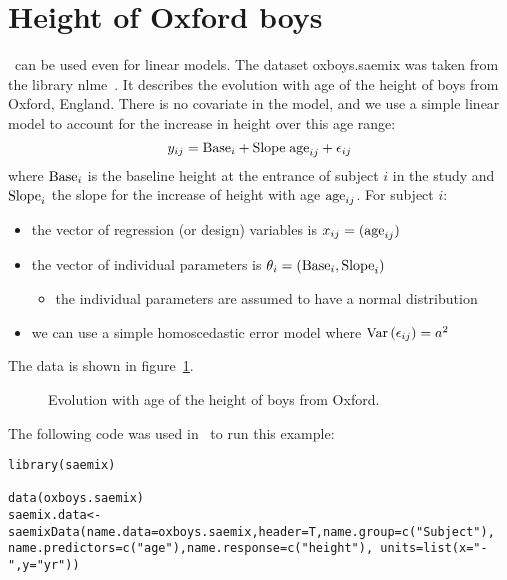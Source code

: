 {\section{Height of Oxford boys} \label{sec:exampleoxboys}

\saemix~can be used even for linear models. The dataset {\sf oxboys.saemix} was taken from the library {\sf nlme}~\cite{nlme}. It describes the evolution with age of the height of boys from Oxford, England. There is no covariate in the model, and we use a simple linear model to account for the increase in height over this age range:
\begin{equation}
y_{ij} = {\rm Base}_i + {\rm Slope} \; {\rm age}_{ij} + \epsilon_{ij}
\end{equation}
where ${\rm Base}_i$ is the baseline height at the entrance of subject $i$ in the study and ${\rm Slope}_i$ the slope for the increase of height with age ${\rm age}_{ij}$. For subject $i$:
\begin{itemize}
\item the vector of regression (or design) variables is $x_{ij} = ({\rm age}_{ij} )$
\item the vector of individual parameters is $\theta_i = \left( {\rm Base}_i, {\rm Slope}_i \right)$
   \begin{itemize}
   \item the individual parameters are assumed to have a normal distribution
   \end{itemize}
\item we can use a simple homoscedastic error model where $\mbox{Var}\left(\epsilon_{ij}\right)=a^2$
\end{itemize}

The data is shown in figure~\ref{fig:oxboysdata}.

\begin{figure}[!h]
\begin{center}
\par \kern -1cm
\end{center}
\par \kern -0.5cm
\caption{Evolution with age of the height of boys from Oxford.} \label{fig:oxboysdata}
\end{figure}

The following code was used in \R~to run this example:
\begin{verbatim}
library(saemix)

data(oxboys.saemix)
saemix.data<-saemixData(name.data=oxboys.saemix,header=T,name.group=c("Subject"), 
name.predictors=c("age"),name.response=c("height"), units=list(x="-",y="yr"))


\end{verbatim}}
